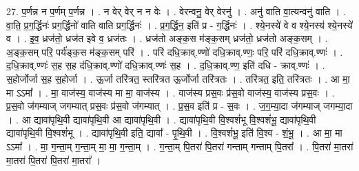 \documentclass[17pt]{extarticle}
\begin{document}
27. प॒र्णन्न न प॒र्णम् प॒र्णन्न । . न वेर् वेर् न न वेः । . वेरन्वनु॒ वेर् वेरनु॑ । . अनु॑ वाति वा॒त्यन्वनु॑ वाति । . वा॒ति॒ प्र॒ग॒र्द्धिनः॑ प्रग॒र्द्धिनो॑ वाति वाति प्रग॒र्द्धिनः॑ । . प्र॒ग॒र्द्धिन॒ इति॑ प्र - ग॒र्द्धिनः॑ । . श्ये॒नस्ये॑ वे व श्ये॒नस्य॑ श्ये॒नस्ये॑ व । . इ॒व॒ ध्रज॑तो॒ ध्रज॑त इवे व॒ ध्रज॑तः । . ध्रज॑तो अङ्क॒स म॑ङ्क॒सम् ध्रज॑तो॒ ध्रज॑तो अङ्क॒सम् । . अ॒ङ्क॒सम् परि॒ पर्य॑ङ्क॒स म॑ङ्क॒सम् परि॑ । . परि॑ दधि॒क्राव्.ण्णो॑ दधि॒क्राव्.ण्णः॒ परि॒ परि॑ दधि॒क्राव्.ण्णः॑ । . द॒धि॒क्राव्.ण्णः॑ स॒ह स॒ह द॑धि॒क्राव्.ण्णो॑ दधि॒क्राव्.ण्णः॑ स॒ह । . द॒धि॒क्राव्.ण्ण॒ इति॑ दधि - क्राव्.ण्णः॑ । . स॒होर्जोर्जा स॒ह स॒होर्जा । . ऊ॒र्जा तरि॑त्रत॒ स्तरि॑त्रत ऊ॒र्जोर्जा तरि॑त्रतः । . तरि॑त्रत॒ इति॒ तरि॑त्रतः । . आ मा॒ मा ऽऽमा᳚ । . मा॒ वाज॑स्य॒ वाज॑स्य मा मा॒ वाज॑स्य । . वाज॑स्य प्रस॒वः प्र॑स॒वो वाज॑स्य॒ वाज॑स्य प्रस॒वः । . प्र॒स॒वो ज॑गम्याज् जगम्यात् प्रस॒वः प्र॑स॒वो ज॑गम्यात् । . प्र॒स॒व इति॑ प्र - स॒वः । . ज॒ग॒म्या॒दा ज॑गम्याज् जगम्या॒दा । . आ द्यावा॑पृथि॒वी द्यावा॑पृथि॒वी आ द्यावा॑पृथि॒वी । . द्यावा॑पृथि॒वी वि॒श्वशं॑भू वि॒श्वशं॑भू॒ द्यावा॑पृथि॒वी द्यावा॑पृथि॒वी वि॒श्वशं॑भू । . द्यावा॑पृथि॒वी इति॒ द्यावा᳚ - पृ॒थि॒वी । . वि॒श्वशं॑भू॒ इति॑ वि॒श्व - शं॒भू॒ । . आ मा॒ मा ऽऽमा᳚ । . मा॒ ग॒न्ता॒म् ग॒न्ता॒म् मा॒ मा॒ ग॒न्ता॒म् । . ग॒न्ता॒म् पि॒तरा॑ पि॒तरा॑ गन्ताम् गन्ताम् पि॒तरा᳚ । . पि॒तरा॑ मा॒तरा॑ मा॒तरा॑ पि॒तरा॑ पि॒तरा॑ मा॒तरा᳚ । \newline
\end{document}
